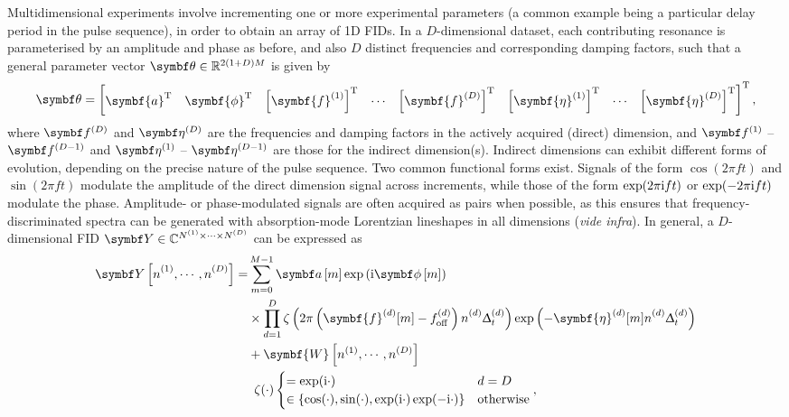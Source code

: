 Multidimensional experiments involve incrementing one or more experimental
parameters (a common example being a particular delay period in the pulse
sequence), in order to obtain an array of \ac{1D} \acp{FID}. In a $D$-dimensional
dataset, each contributing resonance is parameterised by an amplitude and phase
as before, and also $D$ distinct frequencies and corresponding damping factors,
such that a general parameter vector  $\bth \in \mathbb{R}^{2(1+D)M}$ is
given by
\begin{equation}
    \bth =
    \begin{bmatrix}
    \symbf{a}\T &
    \symbf{\phi}\T &
    \left[\symbf{f}^{(1)}\right]\T &
    \cdots &
    \left[\symbf{f}^{(D)}\right]\T &
    \left[\symbf{\eta}^{(1)}\right]\T &
    \cdots &
    \left[\symbf{\eta}^{(D)}\right]\T
    \end{bmatrix}\T,
\end{equation}
where $\bdfD$ and $\bdetaD$ are the frequencies and damping factors in the
actively acquired (direct) dimension, and $\bdfone$ -- $\bdfDminusone$ and
$\bdetaone$ -- $\bdetaDminusone$ are those for the indirect dimension(s).
Indirect dimensions can exhibit different forms of evolution, depending on
the precise nature of the pulse sequence. Two common functional
forms exist\cite[Section 4.3.4]{Cavanagh2007}. Signals of the form $\cos(2 \pi
f t)$ and $\sin(2 \pi f t)$ modulate the amplitude of the direct
dimension signal across increments, while those of the form $\exp(2 \pi \mathrm{i} f
t)$ or $\exp(-2 \pi \mathrm{i} f t)$ modulate the phase.  Amplitude- or
phase-modulated signals are often acquired as pairs when possible, as this
ensures that frequency-discriminated spectra can be generated with
absorption-mode Lorentzian lineshapes in all dimensions (\emph{vide infra}). In
general, a $D$-dimensional \ac{FID}
$\bY \in \mathbb{C}^{\None \times \cdots \times \ND}$ can be expressed as
\begin{subequations}
    \begin{gather}
        \begin{split}
            \bY\left[\none, \cdots, \nD\right] =
                &\sum_{m=0}^{M-1} \bdam \exp\left( \iu \bdphim \right) \\
                &\times \prod_{d=1}^D
                \zeta\left(2 \pi \left(\symbf{f}^{(d)}_{\vphantom{\text{off}}}[m]  - \foffd\right) \nd \Dtd\right)
                \exp\left(-\symbf{\eta}^{(d)}_{\vphantom{\text{off}}}[m] \nd \Dtd\right)\\
                &+\symbf{W}\left[n^{(1)}, \cdots, n^{(D)}\right]
        \end{split}\\
        \zeta(\cdot)
        \begin{cases}
            = \exp(\iu\cdot) & d = D \\
            \in \left\lbrace \cos(\cdot), \sin(\cdot), \exp(\iu\cdot) \exp(-\iu\cdot)\right\rbrace & \text{otherwise}
        \end{cases},
    \end{gather}
    \label{eq:general-fid}%
\end{subequations}%

